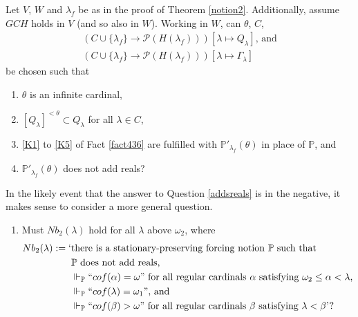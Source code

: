 \documentclass[12pt]{article}
\numberwithin{equation}{section}
\begin{document}
\begin{ques}\label{addsreals2}
Let $V$, $W$ and $\lambda_f$ be as in the proof of Theorem \ref{notion2}. Additionally, assume $GCH$ holds in $V$ (and so also in $W$). Working in  $W$, can $\theta$, $C$, 
\begin{gather*}
    (C \cup \{\lambda_f\} \longrightarrow \mathcal{P}(H(\lambda_f))) [\lambda \mapsto Q_{\lambda}] \text{, and} \\
    (C \cup \{\lambda_f\} \longrightarrow \mathcal{P}(H(\lambda_f))) [\lambda \mapsto \Gamma_{\lambda}]
\end{gather*}
be chosen such that
\begin{enumerate}[label=(\arabic*)]
    \item $\theta$ is an infinite cardinal,
    \item $[Q_{\lambda}]^{< \theta} \subset Q_{\lambda}$ for all $\lambda \in C$,
    \item \ref{K1} to \ref{K5} of Fact \ref{fact436} are fulfilled with $\mathbb{P}'_{\lambda_f}(\theta)$ in place of $\mathbb{P}$, and
    \item $\mathbb{P}'_{\lambda_f}(\theta)$ does not add reals?
\end{enumerate}
\end{ques}

In the likely event that the answer to Question \ref{addsreals} is in the negative, it makes sense to consider a more general question.

\begin{enumerate}[label=(Q\arabic*)]
    \item Must $Nb_2(\lambda)$ hold for all $\lambda$ above $\omega_2$, where 
    \begin{align*}
        Nb_2(\lambda) := \text{`} & \text{there is a stationary-preserving forcing notion } \mathbb{P} \text{ such that} \\ 
        & \mathbb{P} \text{ does not add reals,} \\
        & \Vdash_{\mathbb{P}} ``cof(\alpha) = \omega" \text{ for all regular cardinals } \alpha \text{ satisfying } \omega_2 \leq \alpha < \lambda \text{,} \\
        & \Vdash_{\mathbb{P}} ``cof(\lambda) = \omega_1" \text{, and} \\
        & \Vdash_{\mathbb{P}} ``cof(\beta) > \omega" \text{ for all regular cardinals } \beta \text{ satisfying } \lambda < \beta \text{'?}
\end{align*}
\end{enumerate}
\end{document}
